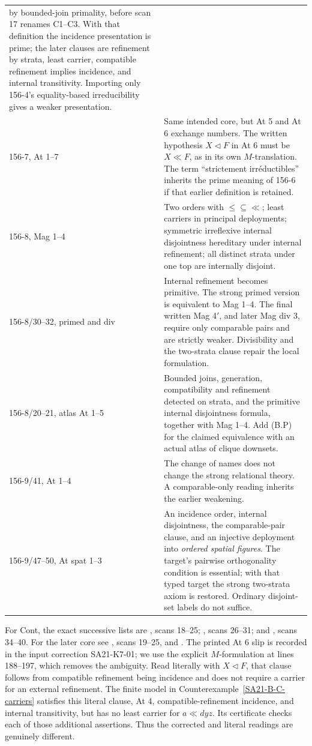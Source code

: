 \begin{longtable}{p{.17\linewidth}p{.74\linewidth}}
by bounded-join primality, before scan 17 renames C1--C3.
With that definition the incidence presentation is prime; the later
clauses are refinement by strata, least carrier, compatible refinement
implies incidence, and internal transitivity. Importing only 156-4's
equality-based irreducibility gives a weaker presentation.\\
156-7, At 1--7 & Same intended core, but At 5 and At 6 exchange numbers.
The written hypothesis \(X\triangleleft F\) in At 6 must be
\(X\ll F\), as in its own \(M\)-translation. The term
``strictement irr\'eductibles'' inherits the prime meaning of 156-6
if that earlier definition is retained.\\
156-8, Mag 1--4 & Two orders with \(\leq\subseteq\ll\); least carriers
in principal deployments; symmetric irreflexive internal disjointness
hereditary under internal refinement; all distinct strata under one
top are internally disjoint.\\
156-8/30--32, primed and div & Internal refinement becomes primitive.
The strong primed version is equivalent to Mag 1--4. The final written
Mag 4\( '\), and later Mag div 3, require only comparable pairs and are
strictly weaker. Divisibility and the two-strata clause repair the
local formulation.\\
156-8/20--21, atlas At 1--5 & Bounded joins, generation, compatibility
and refinement detected on strata, and the primitive internal
disjointness formula, together with Mag 1--4. Add (B.P) for the claimed
equivalence with an actual atlas of clique downsets.\\
156-9/41, At 1--4 & The change of names does not change the strong
relational theory. A comparable-only reading inherits the earlier
weakening.\\
156-9/47--50, At spat 1--3 & An incidence order, internal disjointness,
the comparable-pair clause, and an injective deployment into
\emph{ordered spatial figures}. The target's pairwise orthogonality
condition is essential; with that typed target the strong two-strata
axiom is restored. Ordinary disjoint-set labels do not suffice.\\ \hline
\end{longtable}

For Cont, the exact successive lists are
, scans 18--25;
, scans 26--31; and
,
scans 34--40.
For the later core see
, scans 19--25, and
.
The printed At 6 slip is recorded in the input correction
SA21-K7-01; we use the explicit \(M\)-formulation at lines 188--197,
which removes the ambiguity. Read literally with \(X\triangleleft F\),
that clause follows from compatible refinement being incidence and
does not require a carrier for an external refinement. The finite
model in Counterexample~\ref{SA21-B-C-carriers} satisfies this literal
clause, At 4, compatible-refinement incidence, and internal transitivity,
but has no least carrier for \(a\ll dyz\). Its certificate checks
each of those additional assertions. Thus the corrected and literal
readings are genuinely different.

